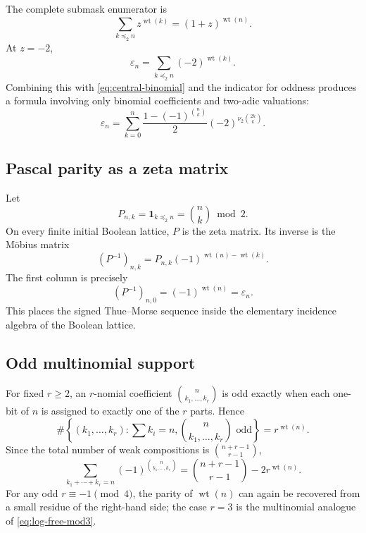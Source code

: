 \documentclass[11pt,oneside]{article}
\numberwithin{equation}{section}
\theoremstyle{definition}
\theoremstyle{remark}
\newcommand{\wt}{\operatorname{wt}}
\newcommand{\vtwo}{\nu_2}
\newcommand{\eps}{\varepsilon}
\newcommand{\ind}{\mathbf 1}
\newcommand{\submask}{\preceq_2}
\begin{document}
The complete submask enumerator is
\begin{equation}
 \boxed{\sum_{k\submask n}z^{\wt(k)}=(1+z)^{\wt(n)}.}
 \label{eq:submask-weight-enumerator}
\end{equation}
At \(z=-2\),
\begin{equation}
 \eps_n=\sum_{k\submask n}(-2)^{\wt(k)}.
 \label{eq:submask-minus-two}
\end{equation}
Combining this with \eqref{eq:central-binomial} and the indicator for oddness
produces a formula involving only binomial coefficients and two-adic
valuations:
\begin{equation}
 \boxed{\eps_n=\sum_{k=0}^n
 \frac{1-(-1)^{\binom nk}}2
 (-2)^{\vtwo\binom{2k}{k}}.}
 \label{eq:pure-binomial-formula}
\end{equation}

\subsection{Pascal parity as a zeta matrix}

Let
\begin{equation}
 P_{n,k}=\ind_{k\submask n}=\binom nk\bmod2.
 \label{eq:pascal-zeta}
\end{equation}
On every finite initial Boolean lattice, \(P\) is the zeta matrix.  Its inverse
is the Möbius matrix
\begin{equation}
 (P^{-1})_{n,k}=P_{n,k}(-1)^{\wt(n)-\wt(k)}.
 \label{eq:pascal-inverse}
\end{equation}
The first column is precisely
\begin{equation}
 (P^{-1})_{n,0}=(-1)^{\wt(n)}=\eps_n.
 \label{eq:pascal-inverse-first-column}
\end{equation}
This places the signed Thue--Morse sequence inside the elementary incidence
algebra of the Boolean lattice.

\subsection{Odd multinomial support}

For fixed \(r\ge2\), an \(r\)-nomial coefficient
\(\binom{n}{k_1,\ldots,k_r}\) is odd exactly when each one-bit of \(n\) is
assigned to exactly one of the \(r\) parts.  Hence
\begin{equation}
 \boxed{\#\left\{(k_1,\ldots,k_r):\sum k_i=n,
 \binom{n}{k_1,\ldots,k_r}\text{ odd}\right\}=r^{\wt(n)}.}
 \label{eq:odd-multinomial-count}
\end{equation}
Since the total number of weak compositions is \(\binom{n+r-1}{r-1}\),
\begin{equation}
 \sum_{k_1+\cdots+k_r=n}
 (-1)^{\binom{n}{k_1,\ldots,k_r}}
 =\binom{n+r-1}{r-1}-2r^{\wt(n)}.
 \label{eq:multinomial-signed-sum}
\end{equation}
For any odd \(r\equiv-1\pmod4\), the parity of \(\wt(n)\) can again be
recovered from a small residue of the right-hand side; the case \(r=3\) is the
multinomial analogue of \eqref{eq:log-free-mod3}.
\end{document}
